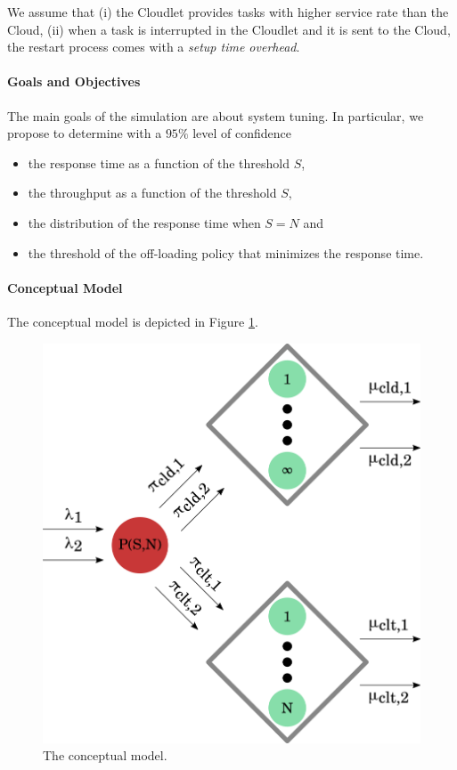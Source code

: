 We assume that
(i) the Cloudlet provides tasks with higher service rate than the Cloud, 
(ii) when a task is interrupted in the Cloudlet and it is sent to the Cloud, the restart process comes with a \textit{setup time overhead}.

\paragraph{Goals and Objectives}
The main goals of the simulation are about system tuning.
In particular, we propose to determine with a $95\%$ level of confidence
\begin{itemize}
	\item the response time as a function of the threshold $S$,
	\item the throughput as a function of the threshold $S$,
	\item the distribution of the response time when $S=N$ and
	\item the threshold of the off-loading policy that minimizes the response time.
\end{itemize}


\paragraph{Conceptual Model}
The conceptual model is depicted in Figure \ref{fig:modeling-conceptual-model}.

\begin{figure}
	\includegraphics[width=\columnwidth]{fig/modeling-conceptual-model}
	\caption{The conceptual model.}
	\label{fig:modeling-conceptual-model}
\end{figure}

